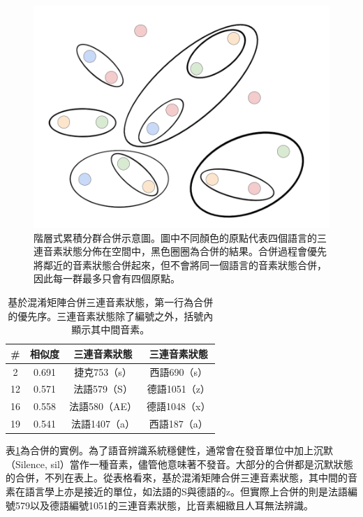 \begin{figure}[!h]
\centering
\includegraphics[scale=0.4]{images/chap4_hac.png}
\caption{階層式累積分群合併示意圖。圖中不同顏色的原點代表四個語言的三連音素狀態分佈在空間中，黑色圈圈為合併的結果。合併過程會優先將鄰近的音素狀態合併起來，但不會將同一個語言的音素狀態合併，因此每一群最多只會有四個原點。}
\label{fig:chap4_hac}
\end{figure}


\begin{table}[!h]
\centering
\begin{tabular}{|cccc|}
\hline
\# & 相似度   & 三連音素狀態    & 三連音素狀態    \\
\hline
2  & 0.691 & 捷克753（s）  & 西語690（s）  \\
\hline
12 & 0.571 & 法語579（S）  & 德語1051（z） \\
\hline
16 & 0.558 & 法語580（AE） & 德語1048（x） \\
\hline
19 & 0.541 & 法語1407（a） & 西語187（a） \\
\hline
\end{tabular}
\caption{基於混淆矩陣合併三連音素狀態，第一行為合併的優先序。三連音素狀態除了編號之外，括號內顯示其中間音素。}
\label{table:chap4_CM_merge_examples}
\end{table}
表\ref{table:chap4_CM_merge_examples}為合併的實例。為了語音辨識系統穩健性，通常會在發音單位中加上沉默（Silence, sil）當作一種音素，儘管他意味著不發音。大部分的合併都是沉默狀態的合併，不列在表上。從表格看來，基於混淆矩陣合併三連音素狀態，其中間的音素在語言學上亦是接近的單位，如法語的S與德語的z。但實際上合併的則是法語編號579以及德語編號1051的三連音素狀態，比音素細緻且人耳無法辨識。

